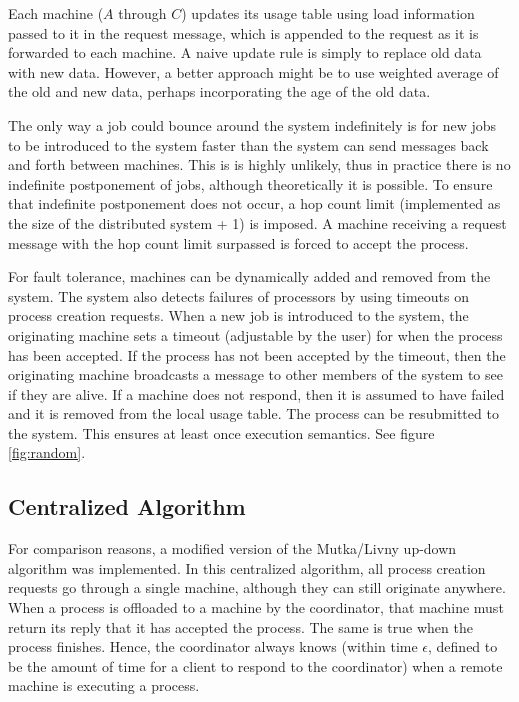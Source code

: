 \documentclass{report}
\begin{document}
Each machine ($A$ through $C$) updates its usage table using load information
passed to it in the request message, which is appended to the request as it
is forwarded to each machine.  A naive update rule is simply to replace old
data with new data.  However, a better approach might be to use weighted
average of the old and new data, perhaps incorporating the age of the old
data.  

The only way a job could bounce around the system indefinitely is for new
jobs to be introduced to the system faster than the system can send messages
back and forth between machines.  This is is highly unlikely, thus in
practice there is no indefinite postponement of jobs, although theoretically
it is possible. To ensure that indefinite postponement does not occur, a hop
count limit (implemented as the size of the distributed system + 1) is
imposed.  A machine receiving a request message with the hop count limit
surpassed is forced to accept the process.


For fault tolerance, machines can be dynamically added and removed from the
system.  The system also detects failures of processors by using timeouts on
process creation requests.  When a new job is introduced to the system, the
originating machine sets a timeout (adjustable by the user) for when the
process has been accepted.  If the process has not been accepted by the
timeout, then the originating machine broadcasts a message to other members
of the system to see if they are alive.  If a machine does not respond, then
it is assumed to have failed and it is removed from the local usage table.
The process can be resubmitted to the system.  This ensures at least once
execution semantics.  See figure \ref{fig:random}.


\subsection{Centralized Algorithm}

For comparison reasons, a modified version of the Mutka/Livny up-down
algorithm was implemented.  In this centralized algorithm, all process
creation requests go through a single machine, although they can still
originate anywhere.  When a process is offloaded to a machine by the
coordinator, that machine must return its reply that it has accepted the
process.  The same is true when the process finishes.  Hence, the
coordinator always knows (within time $\epsilon$, defined to be the amount
of time for a client to respond to the coordinator) when a remote machine is
executing a process.
\end{document}
